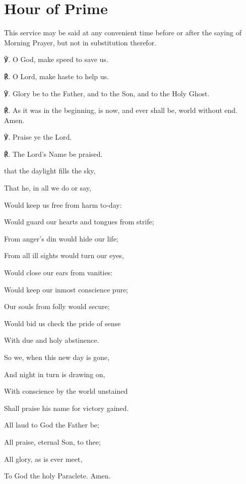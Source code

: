 \fancyhead[RE,LO]{}
\section{Hour of Prime}
\begin{secrubric}
	This service may be said at any convenient time before or after the saying of Morning Prayer, but not in substitution therefor.
\end{secrubric}

\begin{multicols}{2}

℣. O God, {} make speed to save us.

℟. O Lord, make haste to help us.

℣. Glory be to the Father, and to the Son, and to the Holy Ghost.

℟. As it was in the beginning, is now, and ever shall be, world without end. Amen.

℣. Praise ye the Lord.

℟. The Lord's Name be praised.

\begin{hangparas}{1.25em}{1}
 that the daylight fills the sky,\par
{}\par\noindent
That he, in all we do or say,\par\noindent
Would keep us free from harm to-day:\\
\par\noindent
Would guard our hearts and tongues from strife;\par\noindent
From anger's din would hide our life;\par\noindent
From all ill sights would turn our eyes,\par\noindent
Would close our ears from vanities:\\
\par\noindent
Would keep our inmost conscience pure;\par\noindent
Our souls from folly would secure;\par\noindent
Would bid us check the pride of sense\par\noindent
With due and holy abstinence.\\
\par\noindent
So we, when this new day is gone,\par\noindent
And night in turn is drawing on,\par\noindent
With conscience by the world unstained\par\noindent
Shall praise his name for victory gained.\\
\par\noindent
All laud to God the Father be;\par\noindent
All praise, eternal Son, to thee;\par\noindent
All glory, as is ever meet,\par\noindent
To God the holy Paraclete. Amen.\\
\end{hangparas}


\end{multicols}
